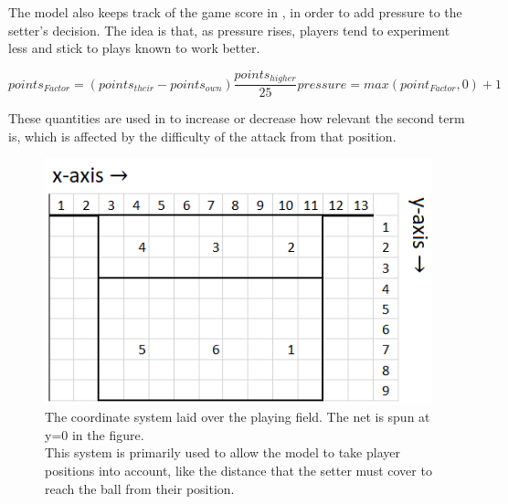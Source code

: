 \documentclass[main.tex]{subfiles}
\begin{document}
      The model also keeps track of the game score in , in order to add pressure to the setter's decision. The idea is that, as pressure rises, players tend to experiment less and stick to plays known to work better.
    
      \begin{subequations}
        \begin{equation}
          points_{Factor}=(points_{their} - points_{own})\frac{points_{higher}}{25} 
          \label{equ:points}
        \end{equation}
        \begin{equation}
          pressure= max( point_{Factor}, 0) + 1      
          \label{equ:pressure}
        \end{equation}
        \label{equ:score}
      \end{subequations}
      
      These quantities are used in  to increase or decrease how relevant the second term is, which is affected by the difficulty of the attack from that position.
      
      \begin{figure}
        \centering
        \includegraphics[width=0.35\linewidth]{figures/playingFieldGridLabelled}
        \caption{The coordinate system laid over the playing field. The net is spun at y=0 in the figure. \\
          This system is primarily used to allow the model to take player positions into account, like the distance that the setter must cover to reach the ball from their position.}
        \label{fig:field}
      \end{figure}
    
\end{document}
